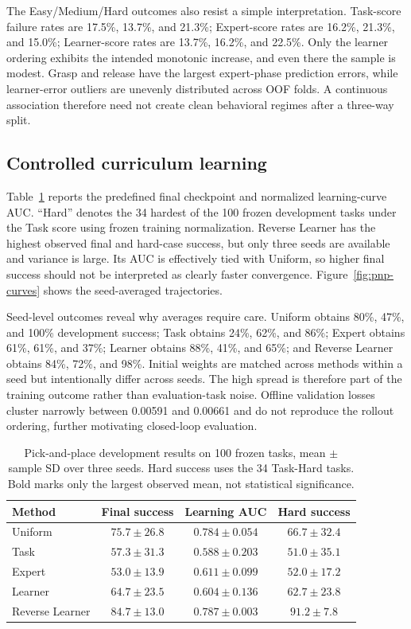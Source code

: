The Easy/Medium/Hard outcomes also resist a simple interpretation. Task-score
failure rates are 17.5\%, 13.7\%, and 21.3\%; Expert-score rates are 16.2\%,
21.3\%, and 15.0\%; Learner-score rates are 13.7\%, 16.2\%, and 22.5\%.
Only the learner ordering exhibits the intended monotonic increase, and even
there the sample is modest. Grasp and release have the largest expert-phase
prediction errors, while learner-error outliers are unevenly distributed
across OOF folds. A continuous association therefore need not create clean
behavioral regimes after a three-way split.

\subsection{Controlled curriculum learning}
Table~\ref{tab:m7} reports the predefined final checkpoint and normalized
learning-curve AUC. ``Hard'' denotes the 34 hardest of the 100 frozen
development tasks under the Task score using frozen training normalization.
Reverse Learner has the highest observed final and hard-case success, but only
three seeds are available and variance is large.
Its AUC is effectively tied with Uniform, so higher final success should not be
interpreted as clearly faster convergence. Figure~\ref{fig:pnp-curves} shows
the seed-averaged trajectories.

Seed-level outcomes reveal why averages require care. Uniform obtains 80\%,
47\%, and 100\% development success; Task obtains 24\%, 62\%, and 86\%; Expert
obtains 61\%, 61\%, and 37\%; Learner obtains 88\%, 41\%, and 65\%; and Reverse
Learner obtains 84\%, 72\%, and 98\%. Initial weights are matched across
methods within a seed but intentionally differ across seeds. The high spread
is therefore part of the training outcome rather than evaluation-task noise.
Offline validation losses cluster narrowly between 0.00591 and 0.00661 and do
not reproduce the rollout ordering, further motivating closed-loop evaluation.

\begin{table}[t]
\centering
\caption{Pick-and-place development results on 100 frozen tasks, mean $\pm$
sample SD over three seeds. Hard success uses the 34 Task-Hard tasks. Bold
marks only the largest observed mean, not statistical significance.}
\label{tab:m7}
\small
\begin{tabular}{lccc}
\toprule
Method & Final success & Learning AUC & Hard success \\
\midrule
Uniform & $75.7\!\pm\!26.8$ & $0.784\!\pm\!0.054$ & $66.7\!\pm\!32.4$ \\
Task & $57.3\!\pm\!31.3$ & $0.588\!\pm\!0.203$ & $51.0\!\pm\!35.1$ \\
Expert & $53.0\!\pm\!13.9$ & $0.611\!\pm\!0.099$ & $52.0\!\pm\!17.2$ \\
Learner & $64.7\!\pm\!23.5$ & $0.604\!\pm\!0.136$ & $62.7\!\pm\!23.8$ \\
Reverse Learner & $\mathbf{84.7\!\pm\!13.0}$ & $0.787\!\pm\!0.003$ & $\mathbf{91.2\!\pm\!7.8}$ \\
\bottomrule
\end{tabular}
\end{table}

